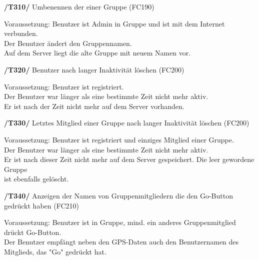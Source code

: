 \textbf{/T310/} Umbenennen der einer Gruppe (FC190)\\
\begin{center}
\vspace{-\parskip}
\begin{minipage}[t]{0.9\textwidth}
Voraussetzung: Benutzer ist Admin in Gruppe und ist mit dem Internet verbunden.\\
Der Benutzer ändert den Gruppennamen.\\
Auf dem Server liegt die alte Gruppe mit neuem Namen vor.\\
\end{minipage}
\end{center}

\textbf{/T320/} Benutzer nach langer Inaktivität löschen (FC200)\\
\begin{center}
\vspace{-\parskip}
\begin{minipage}[t]{0.9\textwidth}
Voraussetzung: Benutzer ist registriert.\\
Der Benutzer war länger als eine bestimmte Zeit nicht mehr aktiv.\\
Er ist nach der Zeit nicht mehr auf dem Server vorhanden.\\
\end{minipage}
\end{center}

\textbf{/T330/} Letztes Mitglied einer Gruppe nach langer Inaktivität löschen (FC200)\\
\begin{center}
\vspace{-\parskip}
\begin{minipage}[t]{0.9\textwidth}
Voraussetzung: Benutzer ist registriert und einziges Mitglied einer Gruppe.\\
Der Benutzer war länger als eine bestimmte Zeit nicht mehr aktiv.\\
Er ist nach dieser Zeit nicht mehr auf dem Server gespeichert. Die leer gewordene Gruppe\\
ist ebenfalls gelöscht.\\
\end{minipage}
\end{center}

\textbf{/T340/} Anzeigen der Namen von Gruppenmitgliedern die den Go-Button gedrückt haben (FC210)\\
\begin{center}
\vspace{-\parskip}
\begin{minipage}[t]{0.9\textwidth}
Voraussetzung: Benutzer ist in Gruppe, mind. ein anderes Gruppenmitglied drückt Go-Button.\\
Der Benutzer empfängt neben den GPS-Daten auch den Benutzernamen des Mitglieds, das "Go" gedrückt hat.\\
\end{minipage}
\end{center}

